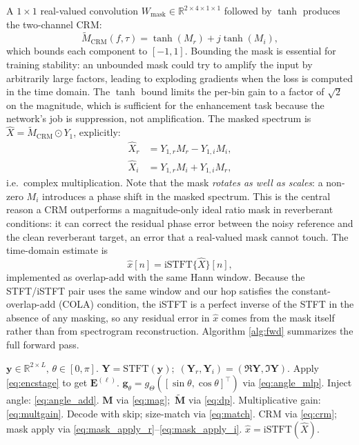 \documentclass[journal,10pt]{IEEEtran}
\newcommand{\R}{\mathbb{R}}
\renewcommand{\Re}{\mathfrak{R}}
\newcommand{\Imm}{\mathfrak{I}}
\newcommand{\by}{\mathbf{y}}
\newcommand{\bY}{\mathbf{Y}}
\newcommand{\bE}{\mathbf{E}}
\newcommand{\bM}{\mathbf{M}}
\newcommand{\bg}{\mathbf{g}}
\newcommand{\STFT}{\mathrm{STFT}}
\newcommand{\iSTFT}{\mathrm{iSTFT}}
\begin{document}
A \(1\!\times\!1\) real-valued convolution \(W_{\mathrm{mask}}\in\R^{2\times 4\times 1\times 1}\) followed by \(\tanh\) produces the two-channel CRM:
\begin{equation}
\widetilde{M}_{\mathrm{CRM}}(f,\tau)=\tanh(M_r)+j\tanh(M_i),
\label{eq:crm}
\end{equation}
which bounds each component to \([-1,1]\). Bounding the mask is essential for training stability: an unbounded mask could try to amplify the input by arbitrarily large factors, leading to exploding gradients when the loss is computed in the time domain. The \(\tanh\) bound limits the per-bin gain to a factor of \(\sqrt{2}\) on the magnitude, which is sufficient for the enhancement task because the network's job is suppression, not amplification. The masked spectrum is \(\hat{X}=\widetilde{M}_{\mathrm{CRM}}\odot Y_1\), explicitly:
\begin{align}
\hat{X}_r&=Y_{1,r}M_r-Y_{1,i}M_i,\label{eq:mask_apply_r}\\
\hat{X}_i&=Y_{1,r}M_i+Y_{1,i}M_r,\label{eq:mask_apply_i}
\end{align}
i.e.\ complex multiplication. Note that the mask \emph{rotates as well as scales}: a non-zero \(M_i\) introduces a phase shift in the masked spectrum. This is the central reason a CRM outperforms a magnitude-only ideal ratio mask in reverberant conditions: it can correct the residual phase error between the noisy reference and the clean reverberant target, an error that a real-valued mask cannot touch. The time-domain estimate is
\begin{equation}
\hat{x}[n]=\iSTFT\{\hat{X}\}[n],
\end{equation}
implemented as overlap-add with the same Hann window. Because the STFT/iSTFT pair uses the same window and our hop satisfies the constant-overlap-add (COLA) condition, the iSTFT is a perfect inverse of the STFT in the absence of any masking, so any residual error in \(\hat{x}\) comes from the mask itself rather than from spectrogram reconstruction. Algorithm \ref{alg:fwd} summarizes the full forward pass.

\begin{algorithm}[t]
\caption{DCCRN--Conformer Forward Pass}
\label{alg:fwd}
\begin{algorithmic}[1]
\REQUIRE \(\by\!\in\!\R^{2\times L},\,\theta\!\in\![0,\pi]\).
\STATE \(\bY=\STFT(\by);\;(\bY_r,\bY_i)=(\Re\bY,\Imm\bY)\).
 \STATE Apply \eqref{eq:encstage} to get \(\bE^{(\ell)}\). \ENDFOR
\STATE \(\bg_\theta=g_\Theta([\sin\theta,\cos\theta]^\top)\) via \eqref{eq:angle_mlp}.
\STATE Inject angle: \eqref{eq:angle_add}.
\STATE \(\bM\) via \eqref{eq:mag};\, \(\widetilde{\bM}\) via \eqref{eq:dp}.
\STATE Multiplicative gain: \eqref{eq:multgain}.
 \STATE Decode with skip; size-match via \eqref{eq:match}. \ENDFOR
\STATE CRM via \eqref{eq:crm}; mask apply via \eqref{eq:mask_apply_r}--\eqref{eq:mask_apply_i}.
\RETURN \(\hat{x}=\iSTFT(\hat{X})\).
\end{algorithmic}
\end{algorithm}
\end{document}
